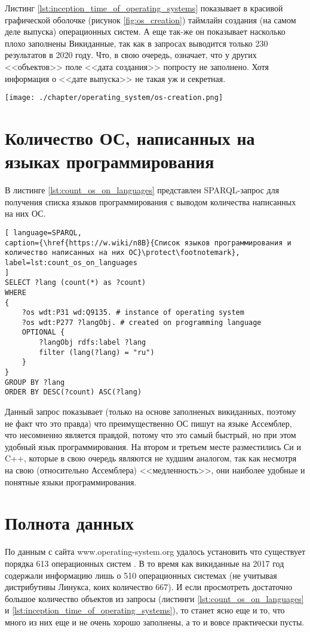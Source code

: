 Листинг \ref{lst:inception_time_of_operating_systems} показывает в красивой графической оболочке (рисунок \ref{fig:os_creation}) таймлайн создания (на самом деле выпуска) операционных систем. А еще так-же он показывает насколько плохо заполнены Викиданные, так как в запросах выводится только 230 результатов в 2020 году. Что, в свою очередь, означает, что у других <<объектов>> поле  <<дата создания>> попросту не заполнено. Хотя информация о <<дате выпуска>> не такая уж и секретная.

\begin{figure*}[h!]
	\texttt{[image: ./chapter/operating\_system/os-creation.png]}
	\caption{Часть таймлайна выпуска операционных систем на 2020 год.}
	\label{fig:os_creation}
\end{figure*}

\section{Количество ОС, написанных на языках программирования}
В листинге \ref{lst:count_os_on_languages} представлен SPARQL-запрос для получения списка языков программирования с выводом количества написанных на них ОС.

\begin{lstlisting}[ language=SPARQL, 
caption={\href{https://w.wiki/n8B}{Список языков программирования и количество написанных на них ОС}\protect\footnotemark},
label=lst:count_os_on_languages
]
SELECT ?lang (count(*) as ?count)
WHERE 
{
	?os wdt:P31 wd:Q9135. # instance of operating system
	?os wdt:P277 ?langObj. # created on programming language
	OPTIONAL {
		?langObj rdfs:label ?lang
		filter (lang(?lang) = "ru")
	}
}
GROUP BY ?lang
ORDER BY DESC(?count) ASC(?lang)
\end{lstlisting}

Данный запрос показывает (только на основе заполненых викиданных, поэтому не факт что это правда) что преимущественно ОС пишут на языке Ассемблер, что несомненно является правдой, потому что это самый быстрый, но при этом удобный язык программирования. На втором и третьем месте разместились Си и C++, которые в свою очередь являются не худшим аналогом, так как несмотря на свою (относительно Ассемблера) <<медленность>>, они наиболее удобные и понятные языки программирования.


\section{Полнота данных}
По данным с сайта www.operating-system.org удалось установить что существует порядка 613 операционных систем \cite{list_operating_systems}. В то время как викиданные на 2017 год содержали информацию лишь о 510 операционных системах (не учитывая дистрибутивы Линукса, коих количество 667). И если просмотреть достаточно большое количество объектов из запросы (листинги \ref{lst:count_os_on_languages} и \ref{lst:inception_time_of_operating_systems}), то станет ясно еще и то, что много из них еще и не очень хорошо заполнены, а то и вовсе практически пусты.


